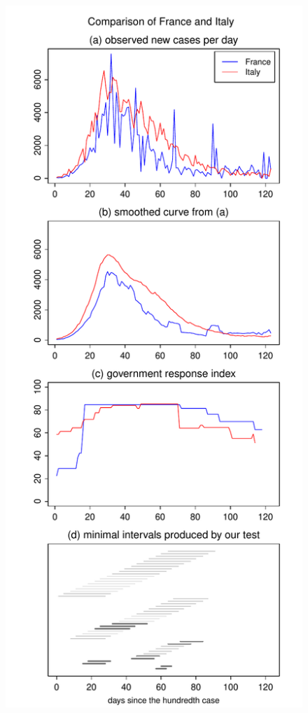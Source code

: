 \documentclass[a4paper,12pt]{article}
\numberwithin{equation}{section}
\begin{document}
\begin{figure}[p!]
\begin{minipage}[t]{0.49\textwidth}
\includegraphics[width=\textwidth]{plots/FRA_vs_ITA}

\end{minipage}
\end{figure}
\end{document}
